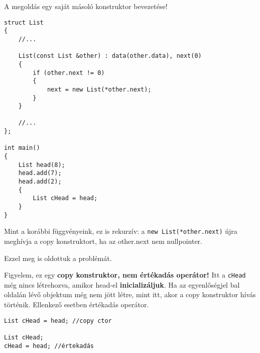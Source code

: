 \documentclass[a4paper,11.5pt,table]{article}
\begin{document}
	A megoldás egy saját másoló konstruktor bevezetése!
	
	
\begin{lstlisting}
struct List
{
	//...
	
	List(const List &other) : data(other.data), next(0)
	{
		if (other.next != 0)
		{
			next = new List(*other.next);
		}
	}
	
	//...
};

int main()
{
	List head(8);
	head.add(7);
	head.add(2);
	{
		List cHead = head;
	}
}
\end{lstlisting}
	Mint a korábbi függvényeink, ez is rekurzív: a \texttt{new List(*other.next)} újra meghívja a copy konstruktort, ha az other.next nem nullpointer.
	\begin{figure}[!h]
		\centering
	\end{figure}
	
	\medskip
	Ezzel meg is oldottuk a problémát. 
	
	Figyelem, ez egy \textbf{copy konstruktor, nem értékadás operátor!} Itt a \texttt{cHead} még nincs létrehozva, amikor head-el \textbf{inicializáljuk}. Ha az egyenlőségjel bal oldalán lévő objektum még nem jött létre, mint itt, akor a copy konstruktor hívás történik. Ellenkező esetben értékadás operátor.
	\begin{lstlisting}
List cHead = head; //copy ctor

List cHead;
cHead = head; //értekadás
	\end{lstlisting}
	
\end{document}
